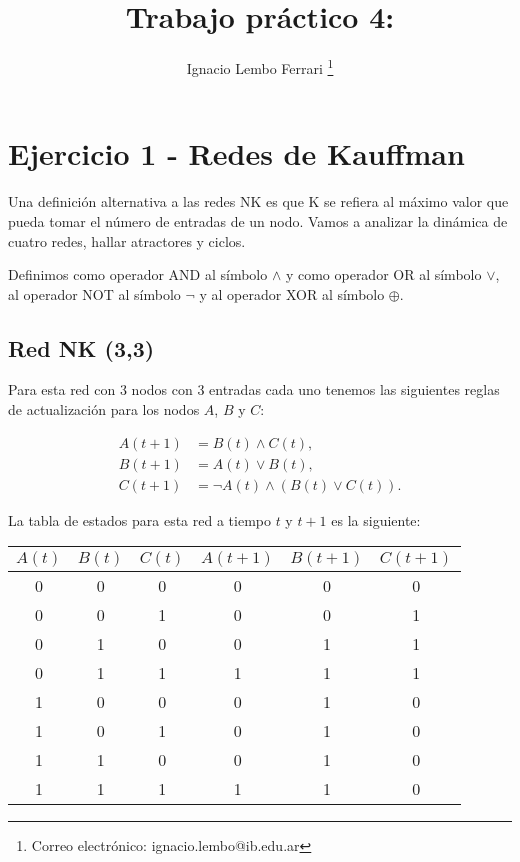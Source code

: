 \documentclass[letterpaper,12pt]{article}
\title{Trabajo práctico 4: } %
\author[1]{Ignacio Lembo Ferrari \thanks{Correo electrónico: ignacio.lembo@ib.edu.ar}}
\affil[1]{Instituto Balseiro}
\date{\vspace{-4ex}}
\theoremstyle{plain}
\begin{document}
\maketitle

\section*{Ejercicio 1 - Redes de Kauffman}

Una definición alternativa a las redes NK es que K se refiera al máximo valor que pueda tomar el número de entradas de un nodo. Vamos a analizar la dinámica de cuatro redes, hallar atractores y ciclos.

Definimos como operador AND al símbolo $\land$ y como operador OR al símbolo $\lor$, al operador NOT al símbolo $\lnot$ y al operador XOR al símbolo $\oplus$. 

\subsection{Red NK (3,3)}

Para esta red con 3 nodos con 3 entradas cada uno tenemos las siguientes reglas de actualización para los nodos $A$, $B$ y $C$:

\begin{align}
    A(t+1) &= B(t) \land C(t), \\
    B(t+1) &= A(t) \lor B(t), \\
    C(t+1) &= \lnot A(t) \land (B(t) \lor C(t)). 
\end{align}

La tabla de estados para esta red a tiempo $t$ y $t+1$ es la siguiente:

\begin{table}[h]
    \centering
    \begin{tabular}{|c|c|c|c|c|c|}
        \hline
        $A(t)$ & $B(t)$ & $C(t)$ & $A(t+1)$ & $B(t+1)$ & $C(t+1)$ \\
        \hline
        0 & 0 & 0 & 0 & 0 & 0  \\
        0 & 0 & 1 & 0 & 0 & 1  \\
        0 & 1 & 0 & 0 & 1 & 1 \\
        0 & 1 & 1 & 1 & 1 & 1  \\
        1 & 0 & 0 & 0 & 1 & 0  \\
        1 & 0 & 1 & 0 & 1 & 0  \\
        1 & 1 & 0 & 0 & 1 & 0  \\
        1 & 1 & 1 & 1 & 1 & 0  \\
        \hline
\end{tabular}
\end{table}
\end{document}
